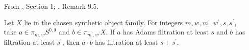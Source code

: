\begin{theorem}
\label{frontier:Literature:3dfd6c694616}
From \cite{Moss}, Section 1; \cite{BHS}, Remark 9.5.\par

Let $X$ lie in the chosen synthetic object family. For integers $m,w,m^{\prime},w^{\prime},s,s^{\prime}$, take $a\in\pi_{m,w}S^{0,0}$ and $b\in\pi_{m^{\prime},w^{\prime}}X$. If $a$ has Adams filtration at least $s$ and $b$ has filtration at least $s^{\prime}$, then $a\cdot b$ has filtration at least $s+s^{\prime}$.
\end{theorem}

